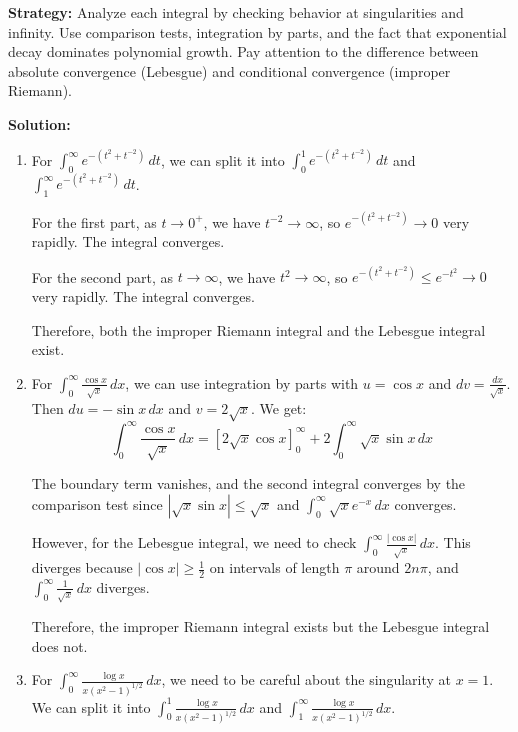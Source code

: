 \noindent\textbf{Strategy:} Analyze each integral by checking behavior at singularities and infinity. Use comparison tests, integration by parts, and the fact that exponential decay dominates polynomial growth. Pay attention to the difference between absolute convergence (Lebesgue) and conditional convergence (improper Riemann).

\bigskip\noindent\textbf{Solution:}
\begin{enumerate}[label=(\alph*)]
\item For $\int_{0}^{\infty} e^{-(t^2 + t^{-2})} \, dt$, we can split it into $\int_{0}^{1} e^{-(t^2 + t^{-2})} \, dt$ and $\int_{1}^{\infty} e^{-(t^2 + t^{-2})} \, dt$.

For the first part, as $t \to 0^+$, we have $t^{-2} \to \infty$, so $e^{-(t^2 + t^{-2})} \to 0$ very rapidly. The integral converges.

For the second part, as $t \to \infty$, we have $t^2 \to \infty$, so $e^{-(t^2 + t^{-2})} \leq e^{-t^2} \to 0$ very rapidly. The integral converges.

Therefore, both the improper Riemann integral and the Lebesgue integral exist.

\item For $\int_{0}^{\infty} \frac{\cos x}{\sqrt{x}} \, dx$, we can use integration by parts with $u = \cos x$ and $dv = \frac{dx}{\sqrt{x}}$. Then $du = -\sin x \, dx$ and $v = 2\sqrt{x}$. We get:
\[\int_{0}^{\infty} \frac{\cos x}{\sqrt{x}} \, dx = \left[2\sqrt{x} \cos x\right]_{0}^{\infty} + 2 \int_{0}^{\infty} \sqrt{x} \sin x \, dx\]

The boundary term vanishes, and the second integral converges by the comparison test since $|\sqrt{x} \sin x| \leq \sqrt{x}$ and $\int_{0}^{\infty} \sqrt{x} e^{-x} \, dx$ converges.

However, for the Lebesgue integral, we need to check $\int_{0}^{\infty} \frac{|\cos x|}{\sqrt{x}} \, dx$. This diverges because $|\cos x| \geq \frac{1}{2}$ on intervals of length $\pi$ around $2n\pi$, and $\int_{0}^{\infty} \frac{1}{\sqrt{x}} \, dx$ diverges.

Therefore, the improper Riemann integral exists but the Lebesgue integral does not.

\item For $\int_{0}^{\infty} \frac{\log x}{x(x^2 - 1)^{1/2}} \, dx$, we need to be careful about the singularity at $x = 1$. We can split it into $\int_{0}^{1} \frac{\log x}{x(x^2 - 1)^{1/2}} \, dx$ and $\int_{1}^{\infty} \frac{\log x}{x(x^2 - 1)^{1/2}} \, dx$.


\end{enumerate}
